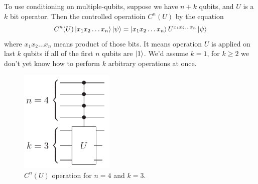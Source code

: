 To use conditioning on multiple-qubits, suppose we have $n+k$ qubits, and $U$ is a $k$ bit operator. Then the controlled operatioin $C^n(U)$ by the equation
\begin{equation}
    C^n(U)\ket{x_1x_2\dots x_n}\ket{\psi} = \ket{x_1x_2\dots x_n}U^{x_1x_2\dots x_n}\ket{\psi}
\end{equation}
where $x_1x_2\dots x_n$ means product of those bits. It means operation $U$ is applied on last $k$ qubits if all of the first $n$ qubits are $\ket{1}$. We'd assume $k=1$, for $k\geq2$ we don't yet know how to perform $k$ arbitrary operations at once.
\begin{figure}[H]
    \centering
    \includegraphics[width=0.4\textwidth]{images/multi_qubit_operation_circuit.png}
    \caption{$C^n(U)$ operation for $n=4$ and $k=3$.}
    \label{fig:multi-qubit-operation}
\end{figure}